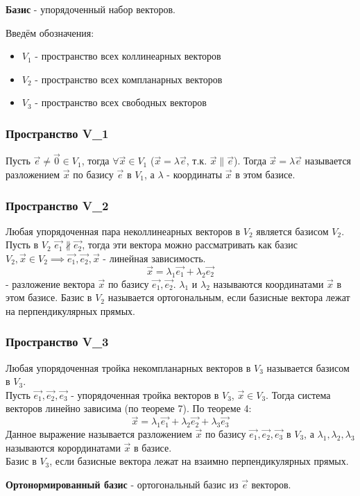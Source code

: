\begin{definition}
  \textbf{Базис} - упорядоченный набор векторов.
\end{definition}

Введём обозначения:
\begin{itemize}
  \item $V_1$ - пространство всех коллинеарных векторов
  \item $V_2$ - пространство всех компланарных векторов
  \item $V_3$ - пространство всех свободных векторов
\end{itemize}

\subsubsection*{Пространство V_1}
Пусть $\vec{e} \neq \vec{0} \in V_1$, тогда $\forall \vec{x} \in V_1$ ($\vec{x} = \lambda \vec{e}$, т.к. $\vec{x} \parallel \vec{e}$). Тогда $\vec{x} = \lambda \vec{e}$ называется разложением $\vec{x}$ по базису $\vec{e}$ в $V_1$, а  $\lambda$ - координаты $\vec{x}$ в этом базисе.

\subsubsection*{Пространство V_2}
Любая упорядоченная пара неколлинеарных векторов в $V_2$ является базисом $V_2$. \\
Пусть в $V_2$ $\vec{e_1} \not \parallel \vec{e_2}$, тогда эти вектора можно рассматривать как базис $V_2, \vec{x} \in V_2 \implies \vec{e_1}, \vec{e_2}, \vec{x}$ - линейная зависимость. 
\[
  \vec{x} = \lambda_1 \vec{e_1} + \lambda_2 \vec{e_2}
\]
- разложение вектора $\vec{x}$ по базису $\vec{e_1}, \vec{e_2}$. $\lambda_1$ и $\lambda_2$ называются координатами $\vec{x}$ в этом базисе.
Базис в $V_2$ называется ортогональным, если базисные вектора лежат на перпендикулярных прямых.

\subsubsection*{Пространство V_3}
Любая упорядоченная тройка некомпланарных векторов в $V_3$ называется базисом в $V_3$.\\
Пусть $\vec{e_1}, \vec{e_2}, \vec{e_3}$ - упорядоченная тройка векторов в $V_3$, $\vec{x} \in V_3$. Тогда система векторов линейно зависима (по теореме 7). По теореме 4:
\[
  \vec{x} = \lambda_1 \vec{e_1} + \lambda_2 \vec{e_2} + \lambda_3 \vec{e_3}
\] 
Данное выражение называется разложением $\vec{x}$ по базису $\vec{e_1}, \vec{e_2}, \vec{e_3}$ в $V_3$, а $\lambda_1, \lambda_2, \lambda_3$ называются корординатами $\vec{x}$ в базисе. \\
Базис в $V_3$, если базисные вектора лежат на взаимно перпендикулярных прямых.

\begin{definition}
  \textbf{Ортонормированный базис} - ортогональный базис из $\vec{e}$ векторов.
\end{definition}

